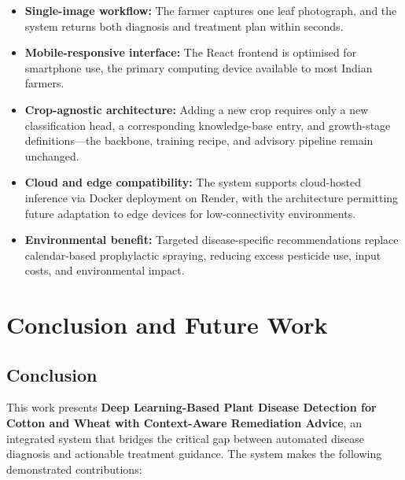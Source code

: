 \documentclass[12pt,a4paper]{report}
\begin{document}
\begin{itemize}
    \item \textbf{Single-image workflow:} The farmer captures one leaf photograph, and the system returns both diagnosis and treatment plan within seconds.
    \item \textbf{Mobile-responsive interface:} The React frontend is optimised for smartphone use, the primary computing device available to most Indian farmers.
    \item \textbf{Crop-agnostic architecture:} Adding a new crop requires only a new classification head, a corresponding knowledge-base entry, and growth-stage definitions---the backbone, training recipe, and advisory pipeline remain unchanged.
    \item \textbf{Cloud and edge compatibility:} The system supports cloud-hosted inference via Docker deployment on Render, with the architecture permitting future adaptation to edge devices for low-connectivity environments.
    \item \textbf{Environmental benefit:} Targeted disease-specific recommendations replace calendar-based prophylactic spraying, reducing excess pesticide use, input costs, and environmental impact.
\end{itemize}

\chapter{Conclusion and Future Work}

\section{Conclusion}
This work presents \textbf{Deep Learning-Based Plant Disease Detection for Cotton and Wheat with Context-Aware Remediation Advice}, an integrated system that bridges the critical gap between automated disease diagnosis and actionable treatment guidance. The system makes the following demonstrated contributions:
\end{document}
